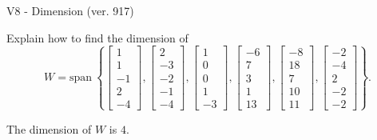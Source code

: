 \begin{exercise}
  \begin{exerciseTitle}V8 - Dimension (ver. 917)\end{exerciseTitle}
  \begin{exerciseStatement}
    Explain how to find the dimension of 
\[W=\mathrm{span}\ \left\{\left[\begin{array}{r}
1 \\
1 \\
-1 \\
2 \\
-4
\end{array}\right] , \left[\begin{array}{r}
2 \\
-3 \\
-2 \\
-1 \\
-4
\end{array}\right] , \left[\begin{array}{r}
1 \\
0 \\
0 \\
1 \\
-3
\end{array}\right] , \left[\begin{array}{r}
-6 \\
7 \\
3 \\
1 \\
13
\end{array}\right] , \left[\begin{array}{r}
-8 \\
18 \\
7 \\
10 \\
11
\end{array}\right] , \left[\begin{array}{r}
-2 \\
-4 \\
2 \\
-2 \\
-2
\end{array}\right]\right\}.\]



  \end{exerciseStatement}
  \begin{exerciseAnswer}
   The dimension of \(W\) is  \(4\).
  


  \end{exerciseAnswer}
\end{exercise}